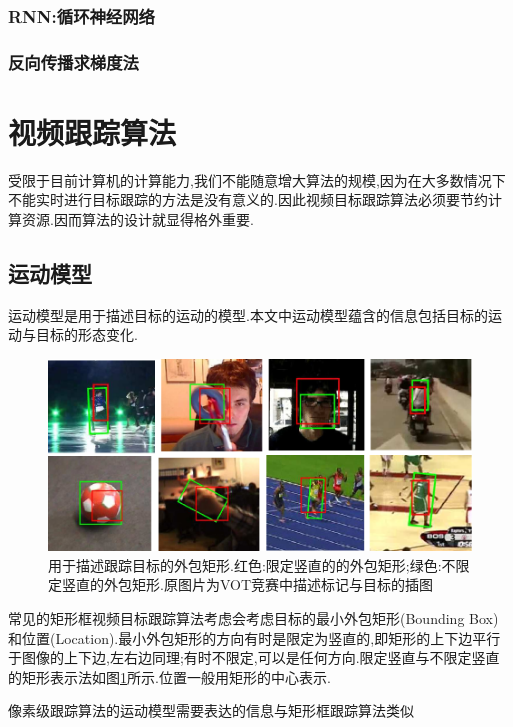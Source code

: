 
\subsubsection{RNN:循环神经网络}
\subsubsection{反向传播求梯度法}

\section{视频跟踪算法}
受限于目前计算机的计算能力,我们不能随意增大算法的规模,因为在大多数情况下不能实时进行目标跟踪的方法是没有意义的.因此视频目标跟踪算法必须要节约计算资源.因而算法的设计就显得格外重要.
\subsection{运动模型}
运动模型是用于描述目标的运动的模型.本文中运动模型蕴含的信息包括目标的运动与目标的形态变化.
\par
\begin{figure}[htbp!]
    \centering
    \includegraphics[width = 1.\textwidth]{chap/img/overlap_examples.pdf}
    \caption{用于描述跟踪目标的外包矩形.红色:限定竖直的的外包矩形;绿色:不限定竖直的外包矩形.原图片为VOT竞赛中描述标记与目标的插图\supercite{VOT_TPAMI}}\label{fig:bunding_boxes}
\end{figure}
\par
常见的矩形框视频目标跟踪算法考虑会考虑目标的最小外包矩形(Bounding Box)和位置(Location).最小外包矩形的方向有时是限定为竖直的,即矩形的上下边平行于图像的上下边,左右边同理;有时不限定,可以是任何方向.限定竖直与不限定竖直的矩形表示法如图\ref{fig:bunding_boxes}所示.位置一般用矩形的中心表示.
\par
像素级跟踪算法的运动模型需要表达的信息与矩形框跟踪算法类似

